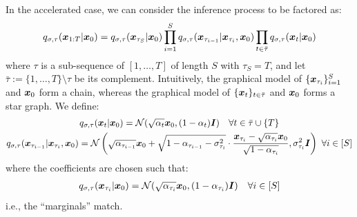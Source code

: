 In the accelerated case, we can consider the inference process to be factored as:
\begin{align}
    q_{\sigma, \tau}({\bm{x}}_{1:T} | {\bm{x}}_0) = q_{\sigma, \tau}({\bm{x}}_{\tau_{S}} | {\bm{x}}_0) \prod_{i=1}^{S} q_{\sigma, \tau}({\bm{x}}_{\tau_{i-1}} | {\bm{x}}_{\tau_{i}}, {\bm{x}}_0) \prod_{t \in \bar{\tau}} q_{\sigma, \tau}({\bm{x}}_{t} | {\bm{x}}_0) \label{eq:diff-new-tau}
\end{align}
where $\tau$ is a sub-sequence of $[1, \ldots, T]$ of length $S$ with $\tau_S = T$, and let $\bar{\tau} := \{1, \ldots, T\} \setminus \tau$ be its complement. Intuitively, the graphical model of $\{{\bm{x}}_{\tau_i}\}_{i=1}^{S}$ and ${\bm{x}}_0$ form a chain, whereas the graphical model of $\{{\bm{x}}_{t}\}_{t \in \bar{\tau}}$ and ${\bm{x}}_0$ forms a star graph. We define:
\begin{gather}
    q_{\sigma, \tau}({\bm{x}}_{t} | {\bm{x}}_0) = {\mathcal{N}}(\sqrt{\alpha_t} {\bm{x}}_0, (1 - \alpha_t) {\bm{I}}) \quad \forall t \in \bar{\tau} \cup \{T\} \\
    q_{\sigma, \tau}({\bm{x}}_{\tau_{i-1}} | {\bm{x}}_{\tau_{i}}, {\bm{x}}_0) = {\mathcal{N}}\left(\sqrt{\alpha_{\tau_{i-1}}} {\bm{x}}_{0} + \sqrt{1 - \alpha_{\tau_{i-1}} - \sigma^2_{\tau_i}} \cdot {\frac{{\bm{x}}_{\tau_i}  - \sqrt{\alpha_{\tau_i}} {\bm{x}}_0}{\sqrt{1 - \alpha_{\tau_i}}}}, \sigma_{{\tau_i}}^2 {\bm{I}} \right) \ \forall i \in [S] \nonumber
\end{gather}
where the coefficients are chosen such that:
\begin{align}
    q_{\sigma, \tau}({\bm{x}}_{\tau_i} | {\bm{x}}_0) = {\mathcal{N}}(\sqrt{\alpha_{\tau_i}} {\bm{x}}_0, (1 - \alpha_{\tau_i}) {\bm{I}}) \quad \forall i \in [S]
\end{align}
i.e., the ``marginals'' match.


